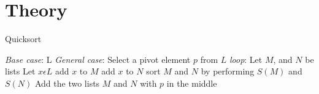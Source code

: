 \section{Theory}
   \begin{algorithm}
        \caption{Quicksort}
            \begin{algorithmic}[1]
                    \BState \emph{Base case}:
                     \Return L
                    \EndIf
                    \BState \emph{General case}:
                    \State Select a pivot element $p$ from $L$
                    \BState \emph{loop}:
                    \State Let $M$, and $N$ be lists
                    \State Let $x \epsilon L$
                    \State {} add $x$ to $M$
                    \EndFor
                    \State {} add $x$ to $N$
                    \EndFor
                    \State sort $M$ and $N$ by performing $S(M)$ and $S(N)$
                    \State Add the two lists $M$ and $N$ with $p$ in the middle
                \EndProcedure
            \end{algorithmic}
    \end{algorithm}

